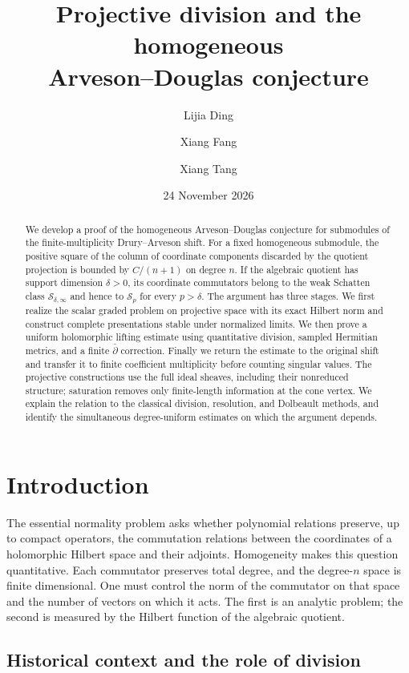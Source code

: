 \documentclass[11pt,reqno]{amsart}
\title[Projective division and the homogeneous Arveson--Douglas conjecture]{Projective division and the homogeneous\\Arveson--Douglas conjecture}
\date{24 November 2026}
\author{Lijia Ding}
\author{Xiang Fang}
\author{Xiang Tang}
\numberwithin{equation}{section}
\theoremstyle{definition}
\theoremstyle{remark}
\newcommand{\cS}{\mathcal S}
\begin{document}
\begin{abstract}
We develop a proof of the homogeneous Arveson--Douglas conjecture for
submodules of the finite-multiplicity Drury--Arveson shift. For a fixed
homogeneous submodule, the positive square of the column of coordinate
components discarded by the quotient projection is bounded by $C/(n+1)$
on degree $n$. If the algebraic quotient has support dimension $\delta>0$,
its coordinate commutators belong to the weak Schatten class
$\cS_{\delta,\infty}$ and hence to $\cS_p$ for every $p>\delta$.
The argument has three stages. We first realize the scalar graded problem
on projective space with its exact Hilbert norm and construct complete
presentations stable under normalized limits. We then prove a uniform
holomorphic lifting estimate using quantitative division, sampled Hermitian
metrics, and a finite $\bar\partial$ correction. Finally we return the
estimate to the original shift and transfer it to finite coefficient
multiplicity before counting singular values. The projective constructions use the full ideal sheaves, including their
nonreduced structure; saturation removes only finite-length information
at the cone vertex.
We explain the relation to the classical division, resolution, and
Dolbeault methods, and identify the simultaneous degree-uniform estimates
on which the argument depends.
\end{abstract}
\maketitle
\tableofcontents

\section{Introduction}
\label{sec:introduction}

The essential normality problem asks whether polynomial relations preserve,
up to compact operators, the commutation relations between the coordinates
of a holomorphic Hilbert space and their adjoints.  Homogeneity makes this
question quantitative.  Each commutator preserves total degree, and the
degree-$n$ space is finite dimensional.  One must control the norm of the
commutator on that space and the number of vectors on which it acts.  The
first is an analytic problem; the second is measured by the Hilbert function
of the algebraic quotient.


\subsection{Historical context and the role of division}
\label{sec:history}
\end{document}
